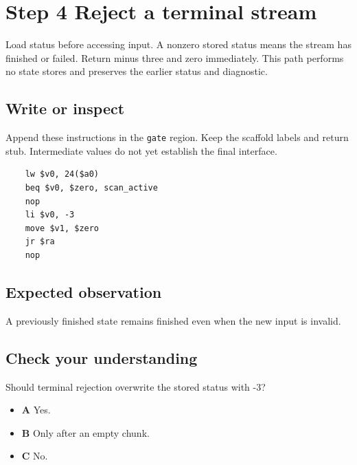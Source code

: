 \section{Step 4 Reject a terminal stream}\label{utf8-s04}

Load status before accessing input. A nonzero stored status means the stream has finished or failed. Return minus three and zero immediately. This path performs no state stores and preserves the earlier status and diagnostic.

\subsection{Write or inspect}
Append these instructions in the \texttt{gate} region. Keep the scaffold labels and return stub. Intermediate values do not yet establish the final interface.

\begin{verbatim}
    lw $v0, 24($a0)
    beq $v0, $zero, scan_active
    nop
    li $v0, -3
    move $v1, $zero
    jr $ra
    nop
\end{verbatim}

\subsection{Expected observation}
A previously finished state remains finished even when the new input is invalid.

\subsection{Check your understanding}
Should terminal rejection overwrite the stored status with -3?

\begin{itemize}
  \item \textbf{A} Yes.
  \item \textbf{B} Only after an empty chunk.
  \item \textbf{C} No.
\end{itemize}
